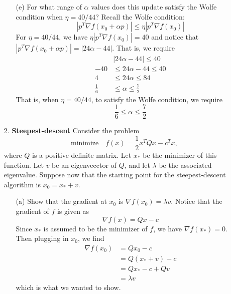 \documentclass{article}
\begin{document}
\begin{itemize}
\begin{itemize}
        \item[(e)] For what range of $\alpha$ values does this update satisfy the Wolfe condition when $\eta = 40/44$?
        \newline\newline
        Recall the Wolfe condition:
        \[|p^T\nabla f(x_0 + \alpha p)| \leq \eta |p^T\nabla f(x_0)|\]
        For $\eta = 40/44$, we have $\eta |p^T \nabla f(x_0)| = 40$ and notice that $|p^T\nabla f(x_0 + \alpha p)| = |24\alpha - 44|$. That is, we require
        \begin{align*}
            &|24\alpha - 44| \leq 40\\
            -40 &\leq 24\alpha - 44 \leq 40\\
            4 &\leq 24\alpha \leq 84\\
            \frac{1}{6} &\leq \alpha \leq \frac{7}{2}
        \end{align*}
        That is, when $\eta = 40/44$, to satisfy the Wolfe condition, we require
        \[\frac{1}{6}\leq \alpha \leq \frac{7}{2}\]
    \end{itemize}
    \pagebreak
    \item[2.] \textbf{Steepest-descent}
    \newline\newline
    Consider the problem
    \[\text{minimize} \hspace{1em} f(x) = \frac{1}{2}x^TQx - c^Tx,\]
    where $Q$ is a positive-definite matrix. Let $x_*$ be the minimizer of this function. Let $v$ be an eigenvecctor of $Q$, and let $\lambda$ be the associated eigenvalue. Suppose now that the starting point for the steepest-descent algorithm is $x_0 = x_* + v$.
    \begin{itemize}
        \item[(a)] Show that the gradient at $x_0$ is $\nabla f(x_0) = \lambda v$.
        \newline\newline
        Notice that the gradient of $f$ is given as
        \[\nabla f(x) = Qx - c\]
        Since $x_*$ is assumed to be the minimizer of $f$, we have $\nabla f(x_*) = 0$. Then plugging in $x_0$, we find
        \begin{align*}
            \nabla f(x_0) &= Qx_0 - c\\
            &= Q(x_* + v) - c\\
            &= Qx_* - c + Qv\\
            &= \lambda v
        \end{align*}
        which is what we wanted to show.
        \newline


\end{itemize}
\end{itemize}
\end{document}
